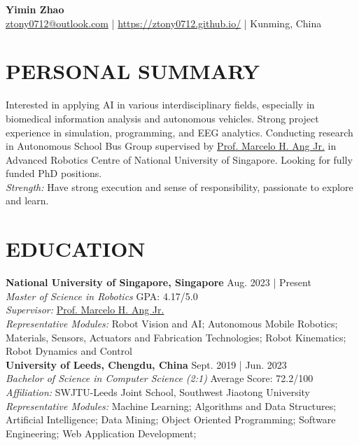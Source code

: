 \documentclass[a4paper,9pt]{extarticle}
\begin{document}
\pagestyle{fancy}
\renewcommand{\headrulewidth}{0pt}
\fancyhead{}
\fancyhead[R]{\textit{\today}}
\thispagestyle{empty} %

\begin{center}
\textbf{\Huge Yimin Zhao}\\ %

\faEnvelope \href{mailto:ztony0712@outlook.com}{ztony0712@outlook.com} | 
\faGlobe \href{https://ztony0712.github.io/}{https://ztony0712.github.io/} | 
\faHome Kunming, China %
\end{center}

\section*{PERSONAL SUMMARY}
\noindent
Interested in applying AI in various interdisciplinary fields, especially in biomedical information analysis and autonomous vehicles. Strong project experience in simulation, programming, and EEG analytics. Conducting research in Autonomous School Bus Group supervised by \href{https://guppy.mpe.nus.edu.sg/~mpeangh/}{Prof. Marcelo H. Ang Jr.} in Advanced Robotics Centre of National University of Singapore. Looking for fully funded PhD positions. \\

\noindent
\textit{Strength:} Have strong execution and sense of responsibility, passionate to explore and learn.

\section*{EDUCATION}
\noindent
\textbf{National University of Singapore, Singapore} \hfill Aug. 2023 | Present \\ %
\textit{Master of Science in Robotics} \hfill GPA: 4.17/5.0 \\
\textit{Supervisor:} \href{https://guppy.mpe.nus.edu.sg/~mpeangh/}{Prof. Marcelo H. Ang Jr.} \\
\textit{Representative Modules:} Robot Vision and AI; Autonomous Mobile Robotics; Materials, Sensors, Actuators and Fabrication Technologies; Robot Kinematics; Robot Dynamics and Control  \\

\noindent
\textbf{University of Leeds, Chengdu, China} \hfill Sept. 2019 | Jun. 2023 \\ %
\textit{Bachelor of Science in Computer Science (2:1)}  \hfill Average Score: 72.2/100 \\ %
\textit{Affiliation:} SWJTU-Leeds Joint School, Southwest Jiaotong University \\
\textit{Representative Modules:} Machine Learning; Algorithms and Data Structures; Artificial Intelligence; Data Mining; Object Oriented Programming; Software Engineering; Web Application Development; 
\end{document}
